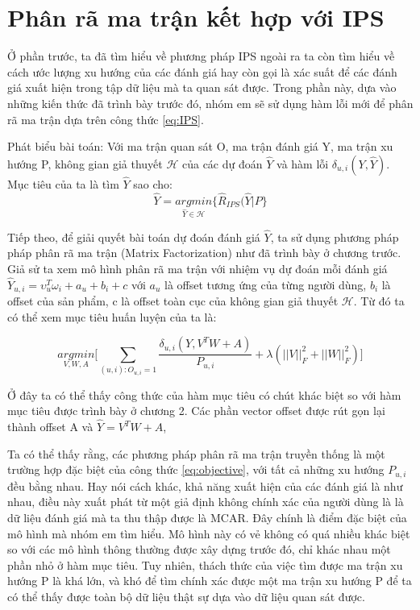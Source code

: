 \section{Phân rã ma trận kết hợp với IPS}
\label{sec:3_MFIPS}
Ở phần trước, ta đã tìm hiểu về phương pháp IPS ngoài ra ta còn tìm hiểu về cách ước lượng xu hướng của các đánh giá hay còn gọi là xác suất để các đánh giá xuất hiện trong tập dữ liệu mà ta quan sát được. Trong phần này, dựa vào những kiến thức đã trình bày trước đó, nhóm em sẽ sử dụng hàm lỗi mới để phân rã ma trận dựa trên công thức \ref{eq:IPS}. 

Phát biểu bài toán: Với ma trận quan sát O, ma trận đánh giá Y, ma trận xu hướng P, không gian giả thuyết $\mathcal{H}$ của các dự đoán $\hat{Y}$ và hàm lỗi $\delta_{u,i}(Y, \hat{Y})$. Mục tiêu của ta là tìm $\hat{Y}$ sao cho:
\begin{equation}
    \label{eq:ERM}
    \hat{Y} = \underset{\hat{Y} \in \mathcal{H}}{argmin}\bigg\{\hat{R}_{IPS}(\hat{Y}|P\bigg\}
\end{equation}

Tiếp theo, để giải quyết bài toán dự đoán đánh giá $\hat{Y}$, ta sử dụng phương pháp pháp phân rã ma trận (Matrix Factorization) như đã trình bày ở chương trước. Giả sử ta xem mô hình phân rã ma trận với nhiệm vụ dự đoán mỗi đánh giá $\hat{Y}_{u,i} = \upsilon_u^T \omega_i + a_u + b_i + c$ với $a_u$ là  offset tương ứng của từng người dùng, $b_i$ là offset của sản phẩm, c là offset toàn cục của không gian giả thuyết $\mathcal{H}$. Từ đó ta có thể xem mục tiêu huấn luyện của ta là:

\begin{equation}
    \label{eq:objective}
    \underset{V,W,A}{argmin} \bigg[ \sum_{(u,i):O_{u,i}=1} \frac{\delta_{u,i}(Y,V^TW + A)}{P_{u,i}} + \lambda(||V||_{F}^2 + ||W||_{F}^2) \Bigg]
\end{equation}

Ở đây ta có thể thấy công thức của hàm mục tiêu có chút khác biệt so với hàm mục tiêu được trình bày ở chương 2. Các phần vector offset được rút gọn lại thành offset A và $\hat{Y} = V^TW + A$, 

Ta có thể thấy rằng, các phương pháp phân rã ma trận truyền thống là một trường hợp đặc biệt của công thức \ref{eq:objective}, với tất cả những xu hướng $P_{u,i}$ đều bằng nhau. Hay nói cách khác, khả năng xuất hiện của các đánh giá là như nhau, điều này xuất phát từ một giả định không chính xác của người dùng là là dữ liệu đánh giá mà ta thu thập được là MCAR. Đây chính là điểm đặc biệt của mô hình mà nhóm em tìm hiểu. Mô hình này có vẻ không có quá nhiều khác biệt so với các mô hình thông thường được xây dựng trước đó, chỉ khác nhau một phần nhỏ ở hàm mục tiêu. Tuy nhiên, thách thức của việc tìm được ma trận xu hướng P là khá lớn, và khó để tìm chính xác được một ma trận xu hướng P để ta có thể thấy được toàn bộ dữ liệu thật sự dựa vào dữ liệu quan sát được. 

